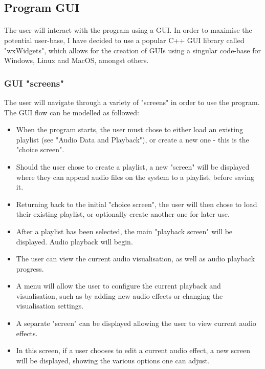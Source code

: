 \pagebreak
\subsection{Program GUI}

\paragraph{}
The user will interact with the program using a GUI. In order to maximise the potential user-base, I have decided to use a popular C++ GUI library called "wxWidgets", which allows for the creation of GUIs using a singular code-base for Windows, Linux and MacOS, amongst others.

\subsubsection{GUI "screens"}
The user will navigate through a variety of "screens" in order to use the program. The GUI flow can be modelled as followed:
\begin{itemize}
	\item When the program starts, the user must chose to either load an existing playlist (see "Audio Data and Playback"), or create a new one - this is the "choice screen".
	\item Should the user chose to create a playlist, a new "screen" will be displayed where they can append audio files on the system to a playlist, before saving it.
	\item Returning back to the initial "choice screen", the user will then chose to load their existing playlist, or optionally create another one for later use.
	\item After a playlist has been selected, the main "playback screen" will be displayed. Audio playback will begin.
	\item The user can view the current audio visualisation, as well as audio playback progress.
	\item A menu will allow the user to configure the current playback and visualisation, such as by adding new audio effects or changing the visualisation settings.
	\item A separate "screen" can be displayed allowing the user to view current audio effects.
	\item In this screen, if a user chooses to edit a current audio effect, a new screen will be displayed, showing the various options one can adjust.
\end{itemize}

